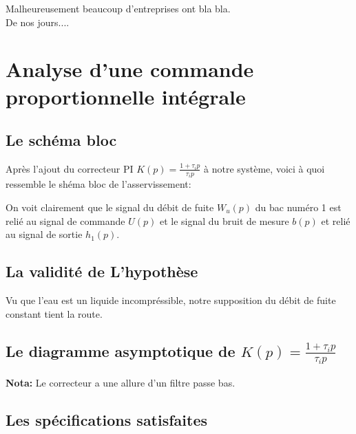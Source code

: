 \documentclass[12pt, a4paper, openany]{report}
\begin{document}
   Malheureusement beaucoup d'entreprises ont bla bla. \\
   
   De nos jours....
   

\chapter{Analyse d'une commande proportionnelle intégrale}

 \section{Le schéma bloc} 

	Après l'ajout du correcteur PI $K(p)=\frac {1+\tau_{i}p}{\tau_{i}p}$ à notre système, voici à quoi ressemble le       shéma bloc de l'asservissement:
  \begin{center}
    \label{fig2}
  \end{center}    
 
	On voit clairement que le signal du débit de fuite $W_{u}(p)$ du bac numéro 1 est relié au signal de commande $U(p)$ et le signal du bruit de mesure $b(p)$ et relié au signal de sortie $h_{1}(p)$.    
	
 \section{La validité de L'hypothèse} 
        
	Vu que l'eau est un liquide incompréssible, notre supposition du débit de fuite constant tient la route.
	
 \section{Le diagramme asymptotique de $K(p)=\frac {1+\tau_{i}p}{\tau_{i}p}$} 
 
  \begin{center}
    \label{fig3}
  \end{center}

  \textbf{Nota:} Le correcteur a une allure d'un filtre passe bas.

 \section{Les spécifications satisfaites}
 
\end{document}
